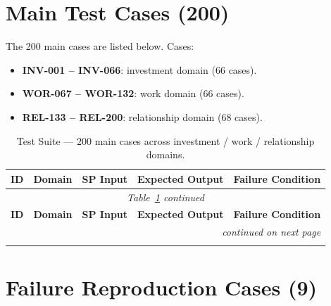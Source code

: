 \section{Main Test Cases (200)}
\label{sec:test-suite-main-200}

The 200 main cases are listed below. Cases:

\begin{itemize}
\item \textbf{INV-001 -- INV-066}: investment domain (66 cases).
\item \textbf{WOR-067 -- WOR-132}: work domain (66 cases).
\item \textbf{REL-133 -- REL-200}: relationship domain (68 cases).
\end{itemize}

{\renewcommand{\arraystretch}{1.05}
\footnotesize
\begin{longtable}{@{}p{1.5cm}p{1.6cm}p{4.5cm}p{4.0cm}p{2.5cm}@{}}
\caption[Test suite 200 cases]{Test Suite --- 200 main cases
across investment / work / relationship domains.}
\label{tab:test-suite-200} \\
\toprule
\textbf{ID} & \textbf{Domain} & \textbf{SP Input} &
\textbf{Expected Output} & \textbf{Failure Condition} \\
\midrule
\endfirsthead

\multicolumn{5}{c}{\textit{Table~\ref{tab:test-suite-200} continued}} \\
\toprule
\textbf{ID} & \textbf{Domain} & \textbf{SP Input} &
\textbf{Expected Output} & \textbf{Failure Condition} \\
\midrule
\endhead

\midrule
\multicolumn{5}{r}{\textit{continued on next page}} \\
\endfoot

\bottomrule
\endlastfoot


\end{longtable}
}

\section{Failure Reproduction Cases (9)}
\label{sec:test-suite-failures-9}


